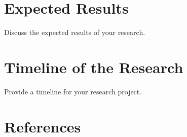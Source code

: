 \documentclass{article}
\begin{document}
\newpage
\section{Expected Results}
Discuss the expected results of your research.

\newpage
\section{Timeline of the Research}
Provide a timeline for your research project.

\newpage
\section{References}
\begin{thebibliography}{9}
\end{thebibliography}
\end{document}
